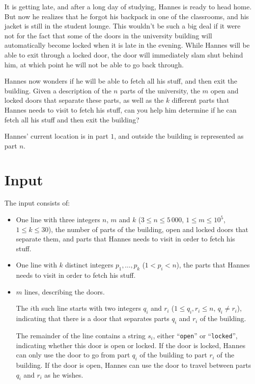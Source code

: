 
%
It is getting late, and after a long day of studying, Hannes is ready to head
home. But now he realizes that he forgot his backpack in one of the classrooms,
and his jacket is still in the student lounge. This wouldn't be such a big deal
if it were not for the fact that some of the doors in the university building
will automatically become locked when it is late in the evening. While
Hannes will be able to exit through a locked door, the door will immediately
slam shut behind him, at which point he will not be able to go back
through.

Hannes now wonders if he will be able to fetch all his stuff, and then exit the
building. Given a description of the $n$ parts of the university, the $m$ open
and locked doors that separate these parts, as well as the $k$ different
parts that Hannes needs to visit to fetch his stuff, can you help him
determine if he can fetch all his stuff and then exit the building?

Hannes' current location is in part $1$, and outside the building is
represented as part $n$.

\section*{Input}
The input consists of:
\begin{itemize}
    \item One line with three integers $n$, $m$ and $k$ ($3 \le n \le 5\,000$, $1
    \le m \le 10^5$, $1 \le k \le 30$), the number of parts of the building,
    open and locked doors that separate them, and parts that Hannes needs to
    visit in order to fetch his stuff.
    \item One line with $k$ distinct integers $p_1,\ldots,p_k$ ($1 < p_i < n$),
    the parts that Hannes needs to visit in order to fetch his stuff.
    \item $m$ lines, describing the doors.

    The $i$th such line starts with two integers $q_i$ and $r_i$ ($1 \le q_i,
    r_i \le n$, $q_i \neq r_i$), indicating that there is a door that separates
    parts $q_i$ and $r_i$ of the building.

    The remainder of the line contains a string $s_i$, either ``\texttt{open}''
    or ``\texttt{locked}'', indicating whether this door is open or locked. If
    the door is locked, Hannes can only use the door to go from part $q_i$ of
    the building to part $r_i$ of the building. If the door is open, Hannes can
    use the door to travel between parts $q_i$ and $r_i$ as he wishes.
\end{itemize}

